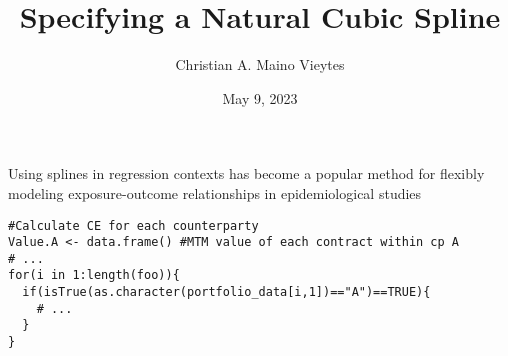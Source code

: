 \documentclass{article}
\title{Specifying a Natural Cubic Spline}
\author{Christian A. Maino Vieytes}
\date{May 9, 2023}
\begin{document}
\maketitle
{}
Using splines in regression contexts has become a popular method for flexibly modeling exposure-outcome relationships in epidemiological studies \supercite{greenland_dose-response_1995, witte_nested_1997}



\newpage
\begin{lstlisting}
#Calculate CE for each counterparty
Value.A <- data.frame() #MTM value of each contract within cp A
# ...
for(i in 1:length(foo)){
  if(isTrue(as.character(portfolio_data[i,1])=="A")==TRUE){
    # ...
  }
}
\end{lstlisting}


\printbibliography[type=article,title={References}]
\end{document}
